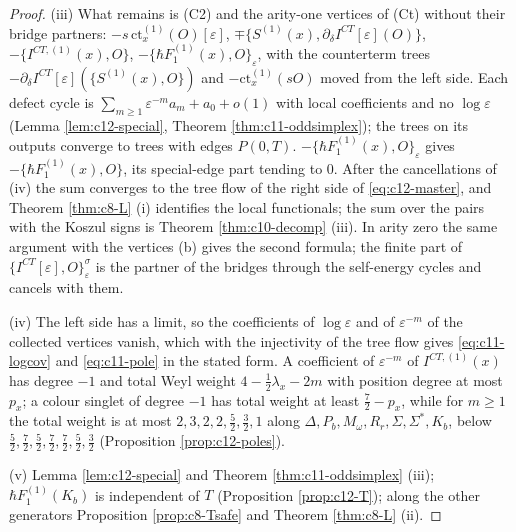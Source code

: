 \begin{proof}
(iii) What remains is (C2) and the arity-one vertices of (Ct) without their bridge partners: $-s\,\mathrm{ct}^{(1)}_x(O)[\varepsilon]$, $\mp\{S^{(1)}(x),\partial_\delta I^{CT}[\varepsilon](O)\}$, $-\{I^{CT,(1)}(x),O\}$, $-\{\hbar F_1^{(1)}(x),O\}_\varepsilon$, with the counterterm trees $-\partial_\delta I^{CT}[\varepsilon](\{S^{(1)}(x),O\})$ and $-\mathrm{ct}^{(1)}_x(sO)$ moved from the left side. Each defect cycle is $\sum_{m\ge1}\varepsilon^{-m}a_m+a_0+o(1)$ with local coefficients and no $\log\varepsilon$ (Lemma \ref{lem:c12-special}, Theorem \ref{thm:c11-oddsimplex}); the trees on its outputs converge to trees with edges $P(0,T)$. $-\{\hbar F_1^{(1)}(x),O\}_\varepsilon$ gives $-\{\hbar F_1^{(1)}(x),O\}$, its special-edge part tending to $0$. After the cancellations of (iv) the sum converges to the tree flow of the right side of \eqref{eq:c12-master}, and Theorem \ref{thm:c8-L} (i) identifies the local functionals; the sum over the pairs with the Koszul signs is Theorem \ref{thm:c10-decomp} (iii). In arity zero the same argument with the vertices (b) gives the second formula; the finite part of $\{I^{CT}[\varepsilon],O\}^\sigma_\varepsilon$ is the partner of the bridges through the self-energy cycles and cancels with them.

(iv) The left side has a limit, so the coefficients of $\log\varepsilon$ and of $\varepsilon^{-m}$ of the collected vertices vanish, which with the injectivity of the tree flow gives \eqref{eq:c11-logcov} and \eqref{eq:c11-pole} in the stated form. A coefficient of $\varepsilon^{-m}$ of $I^{CT,(1)}(x)$ has degree $-1$ and total Weyl weight $4-\tfrac12\lambda_x-2m$ with position degree at most $p_x$; a colour singlet of degree $-1$ has total weight at least $\tfrac72-p_x$, while for $m\ge1$ the total weight is at most $2,3,2,2,\tfrac52,\tfrac32,1$ along $\Delta,P_b,M_\omega,R_r,\Sigma,\Sigma^*,K_b$, below $\tfrac52,\tfrac72,\tfrac52,\tfrac72,\tfrac72,\tfrac52,\tfrac32$ (Proposition \ref{prop:c12-poles}).

(v) Lemma \ref{lem:c12-special} and Theorem \ref{thm:c11-oddsimplex} (iii); $\hbar F_1^{(1)}(K_b)$ is independent of $T$ (Proposition \ref{prop:c12-T}); along the other generators Proposition \ref{prop:c8-Tsafe} and Theorem \ref{thm:c8-L} (ii).
\end{proof}

